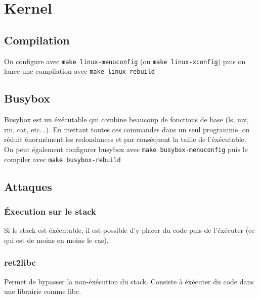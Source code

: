 \documentclass[resume]{subfiles}
\begin{document}
\section{Kernel}
\subsection{Compilation}
On configure avec \verb!make linux-menuconfig! (ou \verb!make linux-xconfig!) puis on lance une compilation avec \verb!make linux-rebuild!
\subsection{Busybox}
Busybox est un éxécutable qui combine beaucoup de fonctions de base (ls, mv, rm, cat, etc...). En mettant toutes ces commandes dans un seul programme, on réduit énormément les redondances et par conséquent la taille de l'éxécutable.\\
On peut également configurer busybox avec \verb!make busybox-menuconfig! puis le compiler avec \verb!make busybox-rebuild!
\subsection{Attaques}
\subsubsection{Éxecution sur le stack}
Si le stack est éxécutable, il est possible d'y placer du code puis de l'éxécuter (ce qui est de moins en moins le cas).
\subsubsection{ret2libc}
Permet de bypasser la non-éxécution du stack. Consiste à éxécuter du code dans une librairie comme libc.
\end{document}
